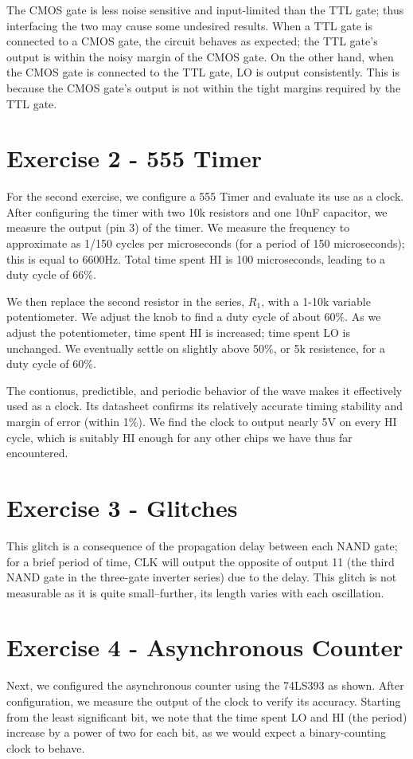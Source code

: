 \documentclass[paper=letter, fontsize=11pt]{scrartcl}
\begin{document}
The CMOS gate is less noise sensitive and input-limited than the TTL gate; thus interfacing the two may cause some undesired results. When a TTL gate is connected to a CMOS gate, the circuit behaves as expected; the TTL gate's output is within the noisy margin of the CMOS gate. On the other hand, when the CMOS gate is connected to the TTL gate, LO is output consistently. This is because the CMOS gate's output is not within the tight margins required by the TTL gate.

\section{Exercise 2 - 555 Timer}
For the second exercise, we configure a 555 Timer and evaluate its use as a clock. After configuring the timer with two 10k resistors and one 10nF capacitor, we measure the output (pin 3) of the timer. We measure the frequency to approximate as 1/150 cycles per microseconds (for a period of 150 microseconds); this is equal to 6600Hz. Total time spent HI is 100 microseconds, leading to a duty cycle of 66\%.

We then replace the second resistor in the series, $R_{1}$, with a 1-10k variable potentiometer. We adjust the knob to find a duty cycle of about 60\%. As we adjust the potentiometer, time spent HI is increased; time spent LO is unchanged. We eventually settle on slightly above 50\%, or 5k resistence, for a duty cycle of 60\%.

The contionus, predictible, and periodic behavior of the wave makes it effectively used as a clock. Its datasheet confirms its relatively accurate timing stability and margin of error (within 1\%). We find the clock to output nearly 5V on every HI cycle, which is suitably HI enough for any other chips we have thus far encountered.

\section{Exercise 3 - Glitches}
This glitch is a consequence of the propagation delay between each NAND gate; for a brief period of time, CLK will output the opposite of output 11 (the third NAND gate in the three-gate inverter series) due to the delay. This glitch is not measurable as it is quite small--further, its length varies with each oscillation.

\section{Exercise 4 - Asynchronous Counter}
Next, we configured the asynchronous counter using the 74LS393 as shown. After configuration, we measure the output of the clock to verify its accuracy. Starting from the least significant bit, we note that the time spent LO and HI (the period) increase by a power of two for each bit, as we would expect a binary-counting clock to behave.
\end{document}
